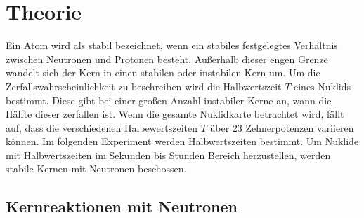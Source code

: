 \section{Theorie}
\label{sec:theorie}

Ein Atom wird als stabil bezeichnet, wenn ein stabiles festgelegtes Verhältnis zwischen Neutronen und Protonen besteht.
Außerhalb dieser engen Grenze wandelt sich der Kern in einen stabilen oder instabilen Kern um.
Um die Zerfallswahrscheinlichkeit zu beschreiben wird die Halbwertszeit $T$ eines Nuklids bestimmt. Diese gibt bei einer 
großen Anzahl instabiler Kerne an, wann die Hälfte dieser zerfallen ist. Wenn die gesamte Nuklidkarte betrachtet wird, fällt auf, dass 
die verschiedenen Halbewertszeiten $T$ über 23 Zehnerpotenzen variieren können.
Im folgenden Experiment werden Halbwertszeiten bestimmt. Um Nuklide mit Halbwertszeiten im Sekunden bis Stunden Bereich herzustellen,
werden stabile Kernen mit Neutronen beschossen.

\subsection{Kernreaktionen mit Neutronen}
\label{sec:Kernreaktionen mit Neutronen}


